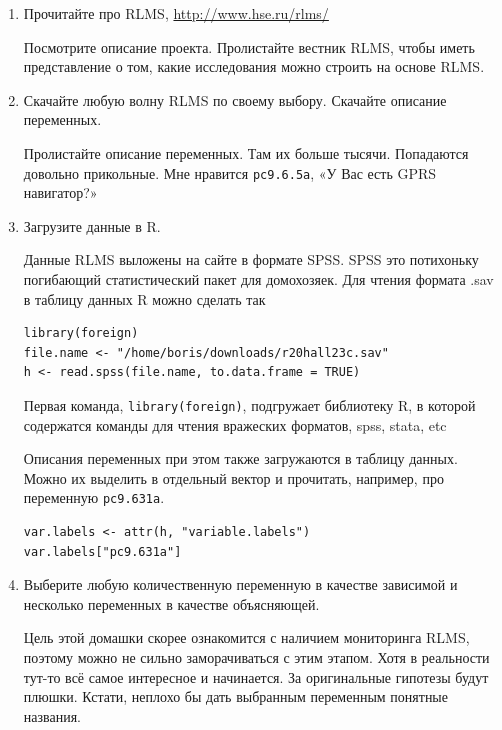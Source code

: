 \documentclass[12pt, a4paper]{article}
\begin{document}
\begin{enumerate}
\item Прочитайте про RLMS, \url{http://www.hse.ru/rlms/}

Посмотрите описание проекта. Пролистайте вестник RLMS, чтобы иметь представление о том, какие исследования можно строить на основе RLMS.

\item Скачайте любую волну RLMS по своему выбору. Скачайте описание переменных.

Пролистайте описание переменных. Там их больше тысячи. Попадаются довольно прикольные. Мне нравится \verb|pc9.6.5a|, «У Вас есть GPRS навигатор?»

\item Загрузите данные в R.

Данные RLMS выложены на сайте в формате SPSS. SPSS это потихоньку погибающий статистический пакет для домохозяек. Для чтения формата .sav в таблицу данных R можно сделать так
\begin{verbatim}
library(foreign)
file.name <- "/home/boris/downloads/r20hall23c.sav"
h <- read.spss(file.name, to.data.frame = TRUE)
\end{verbatim}

Первая команда, \verb|library(foreign)|, подгружает библиотеку R, в которой содержатся команды для чтения вражеских форматов, spss, stata, etc

Описания переменных при этом также загружаются в таблицу данных. Можно их выделить в отдельный вектор и прочитать, например, про переменную \verb|pc9.631a|.

\begin{verbatim}
var.labels <- attr(h, "variable.labels")
var.labels["pc9.631a"]
\end{verbatim}

\item Выберите любую количественную переменную в качестве зависимой и несколько переменных в качестве объясняющей.

Цель этой домашки скорее ознакомится с наличием мониторинга RLMS, поэтому можно не сильно заморачиваться с этим этапом. Хотя в реальности тут-то всё самое интересное и начинается. За оригинальные гипотезы будут плюшки. Кстати, неплохо бы дать выбранным переменным понятные названия.


\end{enumerate}
\end{document}
